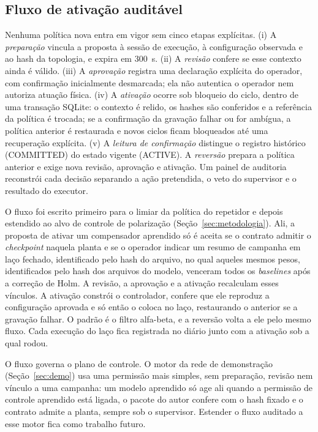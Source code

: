 \documentclass[12pt]{article}
\begin{document}
\subsection{Fluxo de ativação auditável}

Nenhuma política nova entra em vigor sem cinco etapas explícitas. (i) A
\textit{preparação} vincula a proposta à sessão de execução, à configuração
observada e ao hash da topologia, e expira em 300~s. (ii) A \textit{revisão}
confere se esse contexto ainda é válido. (iii) A \textit{aprovação} registra
uma declaração explícita do operador, com confirmação inicialmente desmarcada;
ela não autentica o operador nem autoriza atuação física. (iv) A
\textit{ativação} ocorre sob bloqueio do ciclo, dentro de uma transação SQLite:
o contexto é relido, os hashes são conferidos e a referência da política é
trocada; se a confirmação da gravação falhar ou for ambígua, a política
anterior é restaurada e novos ciclos ficam bloqueados até uma recuperação
explícita. (v) A \textit{leitura de confirmação} distingue o registro histórico
(COMMITTED) do estado vigente (ACTIVE). A \textit{reversão} prepara a política
anterior e exige nova revisão, aprovação e ativação. Um painel de auditoria
reconstrói cada decisão separando a ação pretendida, o veto do supervisor e o
resultado do executor.

O fluxo foi escrito primeiro para o limiar da política do repetidor e depois
estendido ao alvo de controle de polarização (Seção~\ref{sec:metodologia}). Ali,
a proposta de ativar um compensador aprendido só é aceita se o contrato admitir
o \textit{checkpoint} naquela planta e se o operador indicar um resumo de
campanha em laço fechado, identificado pelo hash do arquivo, no qual aqueles
mesmos pesos, identificados pelo hash dos arquivos do modelo, venceram todos os
\textit{baselines} após a correção de Holm. A revisão, a aprovação e a ativação
recalculam esses vínculos. A ativação constrói o controlador, confere que ele
reproduz a configuração aprovada e só então o coloca no laço, restaurando o
anterior se a gravação falhar. O padrão é o filtro alfa-beta, e a reversão
volta a ele pelo mesmo fluxo. Cada execução do laço fica registrada no diário
junto com a ativação sob a qual rodou.

O fluxo governa o plano de controle. O motor da rede de demonstração
(Seção~\ref{sec:demo}) usa uma permissão mais simples, sem preparação, revisão
nem vínculo a uma campanha: um modelo aprendido só age ali quando a permissão de
controle aprendido está ligada, o pacote do autor confere com o hash fixado e o
contrato admite a planta, sempre sob o supervisor. Estender o fluxo auditado a
esse motor fica como trabalho futuro.
\end{document}
